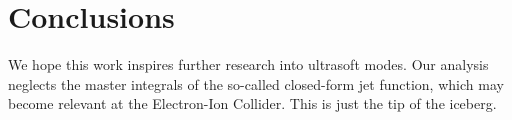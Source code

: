 \section{Conclusions}\label{sec:conclusions}

We hope this work inspires further research into ultrasoft modes. Our
analysis neglects the master integrals of the so-called closed-form jet
function, which may become relevant at the Electron-Ion Collider. This
is just the tip of the iceberg.


